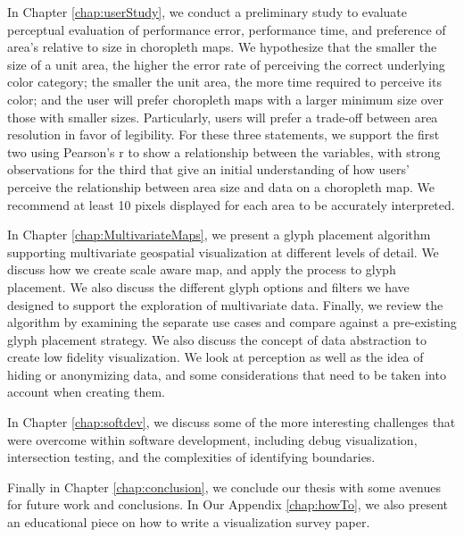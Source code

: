 In Chapter \ref{chap:userStudy}, we conduct a preliminary study to evaluate perceptual evaluation of performance error, performance time, and preference of area's relative to size in choropleth maps. We hypothesize that the smaller the size of a unit area, the higher the error rate of perceiving the correct underlying color category; the smaller the unit area, the more time required to perceive its color; and the user will prefer choropleth maps with a larger minimum size over those with smaller sizes. Particularly, users will prefer a trade-off between area resolution in favor of legibility. For these three statements, we support the first two using Pearson's r to show a relationship between the variables, with strong observations for the third that give an initial understanding of how users' perceive the relationship between area size and data on a choropleth map. We recommend at least 10 pixels displayed for each area to be accurately interpreted.

In Chapter \ref{chap:MultivariateMaps}, we present a glyph placement algorithm supporting multivariate geospatial visualization at different levels of detail.  We discuss how we create scale aware map, and apply the process to glyph placement. We also discuss the different glyph options and filters we have designed to support the exploration of multivariate data. Finally, we review the algorithm by examining the separate use cases and compare against a pre-existing glyph placement strategy. We also discuss the concept of data abstraction to create low fidelity visualization. We look at perception as well as the idea of hiding or anonymizing data, and some considerations that need to be taken into account when creating them.

In Chapter \ref{chap:softdev}, we discuss some of the more interesting challenges that were overcome within software development, including debug visualization, intersection testing, and the complexities of identifying boundaries.

Finally in Chapter \ref{chap:conclusion}, we conclude our thesis with some avenues for future work and conclusions. In Our Appendix \ref{chap:howTo}, we also present an educational piece on how to write a visualization survey paper.